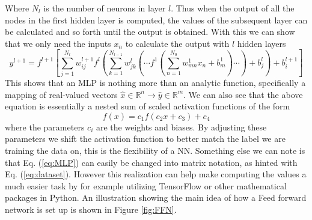 \documentclass[14pt, a4paper]{book}
\begin{document}
Where $N_l$ is the number of neurons in layer $l$. Thus when the output of all the nodes in the first hidden layer is computed, the values of the subsequent layer can be calculated and so forth until the output is obtained. 
With this we can show that we only need the inputs $x_n$ to calculate the output with $l$ hidden layers
\begin{equation}\label{eq:MLP}
    y^{l+1}=f^{l+1}\left[\sum_{j=1}^{N_l}w^{l+1}_{ij}f^l\left(\sum_{k=1}^{N_{l-1}}w^{l}_{jk}\left(\cdots f^{1}\left(\sum_{n=1}^{N_0}w^1_{mn}x_n+b_m^1\right)\cdots\right)+b_j^{l}\right)+b^{l+1}_i   \right]
\end{equation}
This shows that an MLP is nothing more than an analytic function, specifically a mapping of real-valued vectors $\hat{x}\in\mathbb{R}^n\rightarrow\hat{y}\in\mathbb{R}^m$. We can also see that the above equation is essentially 
a nested sum of scaled activation functions of the form
$$
  f(x)=c_1f(c_2x+c_3)+c_4  
$$
where the parameters $c_i$ are the weights and biases. By adjusting these parameters we shift the activation function to better match the label we are training the data on, this is the flexibility of a NN. 
Something else we can note is that Eq. (\ref{eq:MLP}) can easily be changed into matrix notation, as hinted with Eq. (\ref{eq:dataset}). However this realization can help make computing the values a much easier 
task by for example utilizing TensorFlow or other mathematical packages in Python. An illustration showing the main idea of how a Feed forward network is set up is shown in Figure \ref{fig:FFN}.
\end{document}
